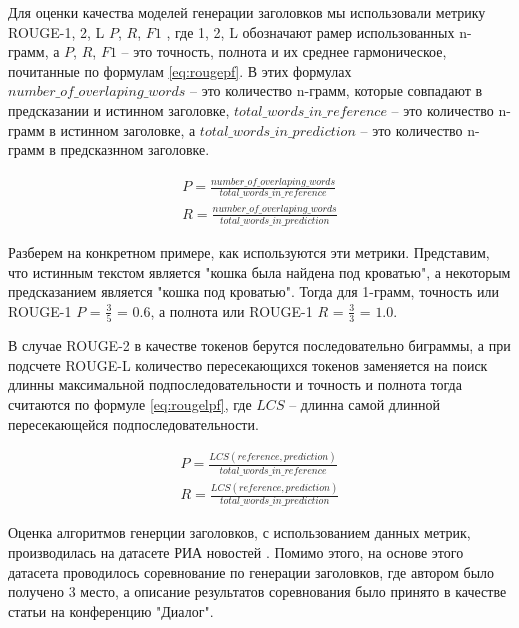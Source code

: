 \documentclass[14pt]{matmex-diploma-custom}
\begin{document}
Для оценки качества моделей генерации заголовков мы использовали метрику ROUGE-1, 2, L $P$, $R$, $F1$ \cite{Lin:2004}, где 1, 2, L обозначают рамер использованных
n-грамм, а $P$, $R$, $F1$ -- это точность, полнота и их среднее гармоническое, почитанные по формулам \ref{eq:rougepf}. В этих формулах $number\_of\_overlaping\_words$ -- это количество n-грамм, которые совпадают в предсказании и истинном заголовке, $total\_words\_in\_reference$ -- это количество n-грамм в истинном заголовке, а $total\_words\_in\_prediction$ -- это количество n-грамм в предсказнном заголовке.

\begin{equation}\label{eq:rougepf}
\begin{gathered}
P = \frac{number\_of\_overlaping\_words}{total\_words\_in\_reference} \\ 
R = \frac{number\_of\_overlaping\_words}{total\_words\_in\_prediction}
\end{gathered}
\end{equation}

Разберем на конкретном примере, как используются эти метрики. Представим, что истинным текстом является "кошка была найдена под кроватью", а некоторым предсказанием является "кошка под кроватью".
Тогда для 1-грамм, точность или ROUGE-1 $P$ = $\frac{3}{5}$ = $0.6$, а полнота или ROUGE-1 $R$ = $\frac{3}{3}$ = $1.0$.

В случае ROUGE-2 в качестве токенов берутся последовательно биграммы, а при подсчете ROUGE-L количество пересекающихся токенов заменяется на поиск длинны максимальной подпоследовательности и точность и полнота тогда считаются по формуле \ref{eq:rougelpf}, где $LCS$ -- длинна самой длинной пересекающейся подпоследовательности.

\begin{equation}\label{eq:rougelpf}
\begin{gathered}
P = \frac{LCS(reference, prediction)}{total\_words\_in\_reference} \\ 
R = \frac{LCS(reference, prediction)}{total\_words\_in\_prediction}
\end{gathered}
\end{equation}

Оценка алгоритмов генерции заголовков, с использованием данных метрик, производилась на датасете 
РИА новостей \cite{gavrilov2018self}. Помимо этого,
на основе этого датасета проводилось соревнование по генерации заголовков, где автором было
получено 3 место, а описание результатов соревнования было принято в качестве статьи на конференцию "Диалог".
\end{document}
